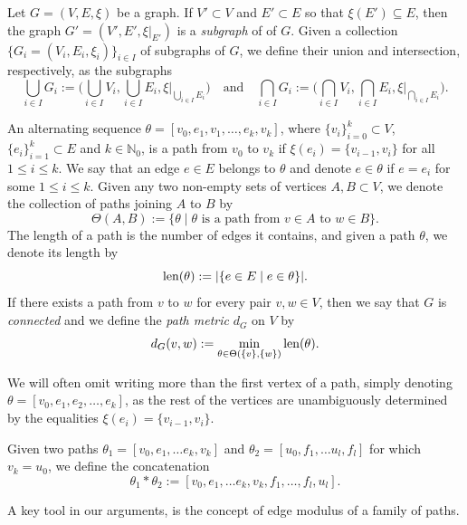 \documentclass{amsart}
\newcommand{\len}{{\rm len}}
\numberwithin{equation}{section}
\theoremstyle{definition}
\theoremstyle{remark}
\newcommand{\N}{\mathbb{N}}
\begin{document}
    Let \(G=(V,E,\xi)\) be a graph. If \(V'\subset V\) and \(E'\subset E\) so that \(\xi(E')\subseteq E\), then the graph \(G'=(V',E',\xi\vert_{E'})\) is a \emph{subgraph} of of \(G\). Given a collection \(\{G_i=(V_i,E_i,\xi_i)\}_{i\in I}\) of subgraphs of \(G\), we define their union and intersection, respectively, as the subgraphs 
        \[
            \bigcup_{i\in I}G_{i}:=\big(\bigcup_{i\in I}V_i,\bigcup_{i\in I}E_i,\xi\vert_{\bigcup_{i\in I}E_i}\big)\quad\text{and}\quad\bigcap_{i\in I}G_{i}:=\big(\bigcap_{i\in I}V_i,\bigcap_{i\in I}E_i,\xi\vert_{\bigcap_{i\in I}E_i}\big).
        \]
        
    An alternating sequence \(\theta=[v_0,e_1,v_1,\ldots,e_k,v_k]\), where \(\{v_i\}_{i=0}^k\subset V\), \(\{e_i\}_{i=1}^k\subset E\) and \(k\in\N_0\), is a path from \(v_0\) to \(v_k\) if \(\xi(e_i)=\{v_{i-1},v_i\}\) for all \(1\leq i\leq k\). We say that an edge \(e\in E\) belongs to \(\theta\) and denote \(e\in\theta\) if \(e=e_i\) for some \(1\leq i\leq k\). Given any two non-empty sets of vertices \(A,B\subset V\), we denote the collection of paths joining \(A\) to \(B\) by
        \[
            \Theta(A,B):=\{\theta\mid \theta \text{ is a path from }v\in A\text{ to }w\in B\}.
        \]
    The length of a path is the number of edges it contains, and given a path \(\theta\), we denote its length by
        \[
            \len(\theta):=\lvert \{e\in E\mid e\in\theta\}\rvert.
        \]
    If there exists a path from \(v\) to \(w\) for every pair \(v,w\in V\), then we say that \(G\) is \emph{connected} and we define the \emph{path metric} \(d_G\) on \(V\) by 
        \[
            d_G(v,w):=\min_{\theta\in\Theta(\{v\},\{w\})}\len(\theta).
        \]
        
    We will often omit writing more than the first vertex of a path, simply denoting \(\theta=[v_0,e_1,e_2,\dots, e_k]\), as the rest of the vertices are unambiguously determined by the equalities \(\xi(e_i)=\{v_{i-1},v_i\}\).

    Given two paths \(\theta_1=[v_0,e_1,\ldots e_k,v_k]\) and \(\theta_2=[u_0,f_1,\ldots u_l,f_l]\) for which \(v_k=u_0\), we define the concatenation
        \[
            \theta_1*\theta_2:=[v_0,e_1,\ldots e_k,v_k,f_1,\ldots, f_l,u_l].
        \]

    A key tool in our arguments, is the concept of edge modulus of a family of paths. 
    
\end{document}
